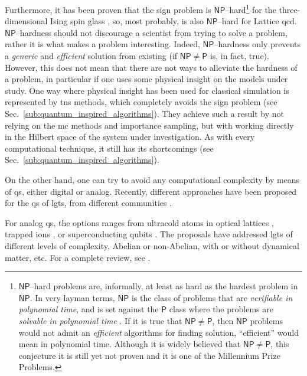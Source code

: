 Furthermore, it has been proven that the sign problem is $\mathsf{NP}$--hard\footnote{
    $\mathsf{NP}$--hard problems are, informally, at least as hard as the hardest problem in $\mathsf{NP}$.
    In very layman terms, $\mathsf{NP}$ is the class of problems that are \emph{verifiable in polynomial time}, and is set against the $\mathsf{P}$ class where the problems are \emph{solvable in polynomial time} \cite{arora2009computational}.
    If it is true that $\mathsf{NP} \neq \mathsf{P}$, then $\mathsf{NP}$ problems would not admit an \emph{efficient} algorithms for finding solution, ``efficient'' would mean in polynomial time.
    Although it is widely believed that $\mathsf{NP} \neq \mathsf{P}$, this conjecture it is still yet not proven and it is one of the Millennium Prize Problems.
}
for the three-dimensional Ising spin glass \cite{troyer2005fermionioc}, so, most probably, is also $\mathsf{NP}$--hard for Lattice \ac{qcd}.
$\mathsf{NP}$--hardness should not discourage a scientist from trying to solve a problem, rather it is what makes a problem interesting.
Indeed, $\mathsf{NP}$--hardness only prevents a \emph{generic} and \emph{efficient} solution from existing (if $\mathsf{NP} \neq \mathsf{P}$ is, in fact, true).
However, this does not mean that there are not ways to alleviate the hardness of a problem, in particular if one uses some physical insight on the models under study.
One way where physical insight has been used for classical simulation is represented by \acp{tn} methods, which completely avoids the sign problem (see Sec.~\ref{sub:quantum_inspired_algorithms}).
They achieve such a result by not relying on the \ac{mc} methods and importance sampling, but with working directly in the Hilbert space of the system under investigation.
As with every computational technique, it still has its shortcomings (see Sec.~\ref{sub:quantum_inspired_algorithms}).

On the other hand, one can try to avoid any computational complexity by means of \ac{qs}, either digital or analog.
Recently, different approaches have been proposed for the \ac{qs} of \ac{lgt}s, from different communities \cite{banuls2020lgtreview, dalmonte2016lgtreview, banuls2020simulating}.

For analog \ac{qs}, the options ranges from ultracold atoms in optical lattices \cite{wiese2013ultracold, zohar2013ultracold, zohar2015quantum, zohar2011qed, banerjee2012atomic}, trapped ions \cite{hauke2013trappedions, yang2016trappedions}, or superconducting qubits \cite{marcos2013sclgt, marcos2014sclgt2d, brennen2016lgt}.
The proposals have addressed \acp{lgt} of different levels of complexity, Abelian or non-Abelian, with or without dynamical matter, etc.
For a complete review, see \cite{banuls2020simulating, banuls2020lgtreview}.

